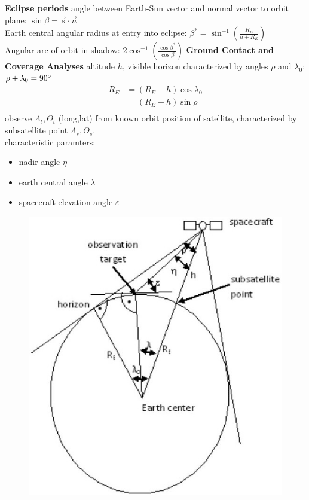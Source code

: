 \documentclass[a4paper,10pt]{article}
\newcommand{\f}{\textbf}
\begin{document}
\f{Eclipse periods}
angle between Earth-Sun vector and normal vector to orbit plane: $\sin \beta = \vec{s}\cdot\vec{n}$\\
Earth central angular radius at entry into eclipse: $\beta^* = \sin^{-1}\left(\frac{R_E}{h+R_E}\right)$\\
Angular arc of orbit in shadow: $2\cos^{-1}\left(\frac{\cos \beta^*}{\cos \beta}\right)$
\f{Ground Contact and Coverage Analyses}
altitude $h$, visible horizon characterized by angles $\rho$ and $\lambda_0$: $\rho + \lambda_0 = 90\degree$
\begin{align*}
 R_E &= (R_E + h) \cos \lambda_0\\
 &= (R_E +h) \sin \rho\\
\end{align*}
observe $\Lambda_t, \Theta_t$ (long,lat) from known orbit position of satellite, characterized by subsatellite point $\Lambda_s, \Theta_s$.\\
characteristic paramters:
\begin{itemize}
 \item nadir angle $\eta$
 \item earth central angle $\lambda$
 \item spacecraft elevation angle $\varepsilon$
\end{itemize}
\begin{figure}[!ht]
 \centering
 \includegraphics[scale=0.6]{groundcoverage}
\end{figure}
\end{document}
